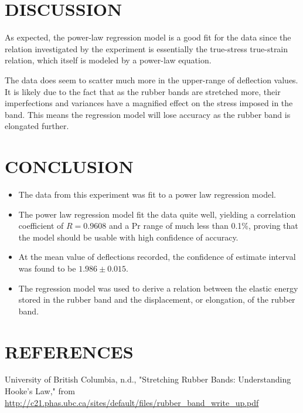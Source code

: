 \documentclass[12pt]{article}
\begin{document}
\section*{\fontsize{12}{12}\selectfont DISCUSSION}
As expected, the power-law regression model is a good fit for the data since the relation investigated by the experiment is essentially the true-stress true-strain relation, which itself is modeled by a power-law equation.
\bigskip

The data does seem to scatter much more in the upper-range of deflection values. It is likely due to the fact that as the rubber bands are stretched more, their imperfections and variances have a magnified effect on the stress imposed in the band. This means the regression model will lose accuracy as the rubber band is elongated further.


\section*{\fontsize{12}{12}\selectfont CONCLUSION}

\begin{itemize}
	\item The data from this experiment was fit to a power law regression model.
	\item The power law regression model fit the data quite well, yielding a correlation coefficient of $R=0.9608$ and a Pr range of much less than 0.1\%, proving that the model should be usable with high confidence of accuracy.
	\item At the mean value of deflections recorded, the confidence of estimate interval was found to be $1.986 \pm 0.015$.
	\item The regression model was used to derive a relation between the elastic energy stored in the rubber band and the displacement, or elongation, of the rubber band.
\end{itemize}

\bigskip


\section*{\fontsize{12}{12}\selectfont REFERENCES}

\begin{thebibliography}{2}

University of British Columbia, n.d., "Stretching Rubber Bands: Understanding Hooke's Law," from
 \url{http://c21.phas.ubc.ca/sites/default/files/rubber_band_write_up.pdf}

\end{thebibliography}


\end{document}
